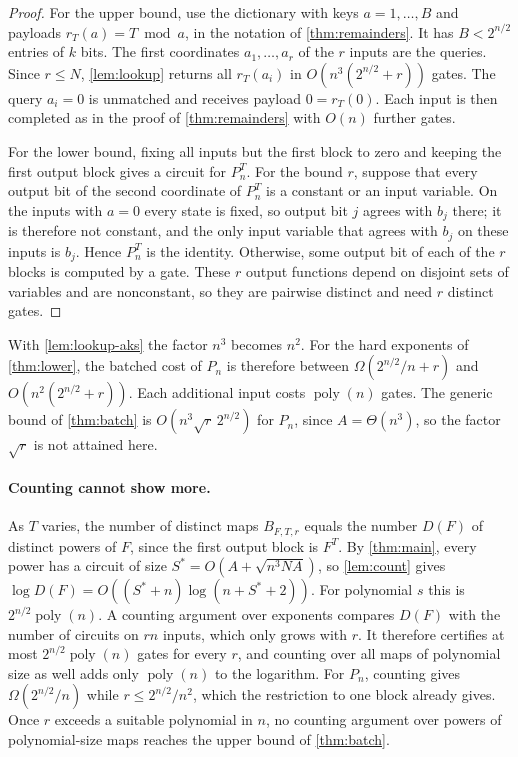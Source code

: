 \documentclass[11pt]{article}
\theoremstyle{definition}
\theoremstyle{remark}
\newcommand{\poly}{\operatorname{poly}}
\numberwithin{equation}{section}
\begin{document}
\begin{proof}
For the upper bound, use the dictionary with keys $a=1,\ldots,B$ and
payloads $r_T(a)=T\bmod a$, in the notation of \cref{thm:remainders}.
It has $B<2^{n/2}$ entries of $k$ bits.  The first coordinates
$a_1,\ldots,a_r$ of the $r$ inputs are the queries.  Since $r\leq N$,
\cref{lem:lookup} returns all $r_T(a_i)$ in $O(n^3(2^{n/2}+r))$ gates.
The query $a_i=0$ is unmatched and receives payload $0=r_T(0)$.  Each
input is then completed as in the proof of \cref{thm:remainders} with
$O(n)$ further gates.

For the lower bound, fixing all inputs but the first block to zero and
keeping the first output block gives a circuit for $P_n^T$.  For the
bound $r$, suppose that every output bit of the second coordinate of
$P_n^T$ is a constant or an input variable.  On the inputs with $a=0$
every state is fixed, so output bit $j$ agrees with $b_j$ there; it is
therefore not constant, and the only input variable that agrees with
$b_j$ on these inputs is $b_j$.  Hence $P_n^T$ is the identity.
Otherwise, some output bit of each of the $r$ blocks is computed by a
gate.  These $r$ output functions depend on disjoint sets of variables
and are nonconstant, so they are pairwise distinct and need $r$
distinct gates.
\end{proof}

With \cref{lem:lookup-aks} the factor $n^3$ becomes $n^2$.  For the
hard exponents of \cref{thm:lower}, the batched cost of $P_n$ is
therefore between $\Omega(2^{n/2}/n+r)$ and $O(n^2(2^{n/2}+r))$.  Each
additional input costs $\poly(n)$ gates.  The generic bound of
\cref{thm:batch} is $O(n^3\sqrt r\,2^{n/2})$ for $P_n$, since
$A=\Theta(n^3)$, so the factor $\sqrt r$ is not attained here.

\paragraph{Counting cannot show more.}
As $T$ varies, the number of distinct maps $B_{F,T,r}$ equals the number
$D(F)$ of distinct powers of $F$, since the first output block is
$F^T$.  By \cref{thm:main}, every power has a circuit of size
$S^*=O(A+\sqrt{n^3NA})$, so \cref{lem:count} gives
$\log D(F)=O((S^*+n)\log(n+S^*+2))$.  For polynomial $s$ this is
$2^{n/2}\poly(n)$.  A counting argument over exponents compares $D(F)$
with the number of circuits on $rn$ inputs, which only grows with $r$.
It therefore certifies at most $2^{n/2}\poly(n)$ gates for every $r$,
and counting over all maps of polynomial size as well adds only
$\poly(n)$ to the logarithm.  For $P_n$, counting gives
$\Omega(2^{n/2}/n)$ while $r\leq 2^{n/2}/n^2$, which the restriction to
one block already gives.  Once $r$ exceeds a suitable polynomial in $n$,
no counting argument over powers of polynomial-size maps reaches the
upper bound of \cref{thm:batch}.
\end{document}
